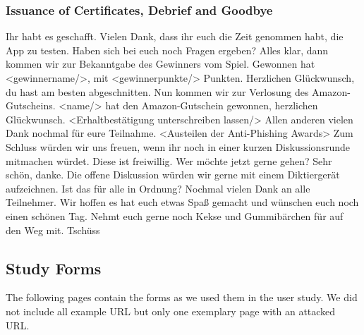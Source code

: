 \subsubsection{Issuance of Certificates, Debrief and Goodbye}
Ihr habt es geschafft.
Vielen Dank, dass ihr euch die Zeit genommen habt, die App zu testen.
Haben sich bei euch noch Fragen ergeben?
\newline
\newline
Alles klar, dann kommen wir zur Bekanntgabe des Gewinners vom Spiel.
Gewonnen hat <gewinnername/>, mit <gewinnerpunkte/> Punkten.
Herzlichen Gl{\"u}ckwunsch, du hast am besten abgeschnitten. 
\newline
\newline
Nun kommen wir zur Verlosung des Amazon-Gutscheins. 
<name/> hat den Amazon-Gutschein gewonnen, herzlichen Gl{\"u}ckwunsch. \newline
<Erhaltbest{\"a}tigung unterschreiben lassen/>
\newline
\newline
Allen anderen vielen Dank nochmal f{\"u}r eure Teilnahme.\newline
<Austeilen der Anti-Phishing Awards>
\newline
\newline
Zum Schluss w{\"u}rden wir uns freuen, wenn ihr noch in einer kurzen Diskussionsrunde mitmachen w{\"u}rdet. Diese ist freiwillig. Wer m{\"o}chte jetzt gerne gehen? Sehr sch{\"o}n, danke.
\newline
\newline
Die offene Diskussion w{\"u}rden wir gerne mit einem Diktierger{\"a}t aufzeichnen. Ist das f{\"u}r alle in Ordnung?
\newline
\newline
Nochmal vielen Dank an alle Teilnehmer.
Wir hoffen es hat euch etwas Spa{\ss} gemacht und w{\"u}nschen euch noch einen sch{\"o}nen Tag.
Nehmt euch gerne noch Kekse und Gummib{\"a}rchen f{\"u}r auf den Weg mit.
\newline
\newline
Tsch{\"u}ss

\subsection{Study Forms}
The following pages contain the forms as we used them in the user study. We did not include all example URL but only one exemplary page with an attacked URL.
\label{s:before_survey}

\label{s:url_survey}

\label{s:after_survey}


